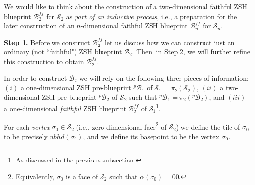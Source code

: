 \documentclass[12pt,letterpaper]{article}
\renewcommand{\S}{\mathcal{S}}
\newcommand{\B}{\mathcal{B}}
\newcommand{\nbhd}{\mathit{nbhd}}
\renewcommand{\a}{\alpha}
\begin{document}
\bigskip

We would like to think about the construction of a two-dimensional faithful ZSH blueprint $\B_2^\mathit{ff}$ for $\S_2$ as {\em part of an inductive process}, i.e., a preparation for the later construction of an $n$-dimensional faithful ZSH blueprint $\B_n^\mathit{ff}$ for $\S_n$.

\bigskip 

\noindent
{\bf Step 1.} 
Before we construct $\B_2^\mathit{ff}$ let us discuss how we can construct just an ordinary (not ``faithful") ZSH blueprint $\B_2$. Then, in Step 2, we will further refine this construction to obtain $\B_2^\mathit{ff}$. 
 
In order to construct $\B_2$ we will rely on the following three pieces of information: $(i)$ a one-dimensional ZSH pre-blueprint $^p\!\B_1$ of $\S_1 = \pi_2(\S_2)$, $(ii)$ a two-dimensional ZSH pre-blueprint $^p\!\B_2$ of $\S_2$ such that $^p\!\B_1 = \pi_2(^p\!\B_2)$, and $(iii)$ a one-dimensional {\em faithful} ZSH blueprint $\B_2^\mathit{ff}$ of $\S_1$\footnote{As discussed in the previous subsection.}. 



\smallskip



%

\smallskip

For each {\em vertex} $\sigma_0 \in \S_2$ (i.e., zero-dimensional face\footnote{Equivalently, $\sigma_0$ is a face of $\S_2$ such that $\a(\sigma_0) = 00$.} of $\S_2$) we define the tile of $\sigma_0$ to be  precisely $\nbhd(\sigma_0)$, and we define its basepoint to be the vertex $\sigma_0$.
\end{document}
